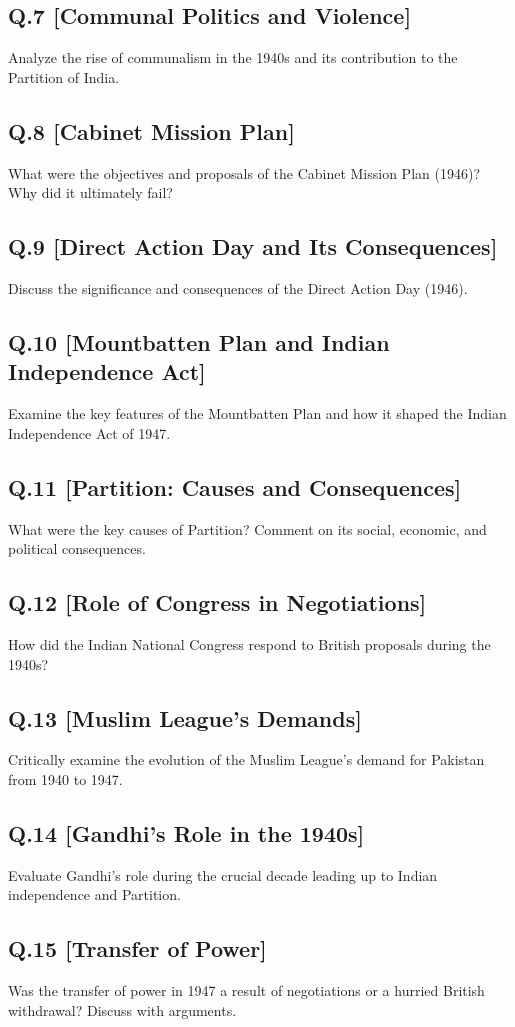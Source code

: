 \subsection*{Q.7 [Communal Politics and Violence]}
Analyze the rise of communalism in the 1940s and its contribution to the Partition of India.

\subsection*{Q.8 [Cabinet Mission Plan]}
What were the objectives and proposals of the Cabinet Mission Plan (1946)? Why did it ultimately fail?

\subsection*{Q.9 [Direct Action Day and Its Consequences]}
Discuss the significance and consequences of the Direct Action Day (1946).

\subsection*{Q.10 [Mountbatten Plan and Indian Independence Act]}
Examine the key features of the Mountbatten Plan and how it shaped the Indian Independence Act of 1947.

\subsection*{Q.11 [Partition: Causes and Consequences]}
What were the key causes of Partition? Comment on its social, economic, and political consequences.

\subsection*{Q.12 [Role of Congress in Negotiations]}
How did the Indian National Congress respond to British proposals during the 1940s?

\subsection*{Q.13 [Muslim League’s Demands]}
Critically examine the evolution of the Muslim League’s demand for Pakistan from 1940 to 1947.

\subsection*{Q.14 [Gandhi’s Role in the 1940s]}
Evaluate Gandhi’s role during the crucial decade leading up to Indian independence and Partition.

\subsection*{Q.15 [Transfer of Power]}
Was the transfer of power in 1947 a result of negotiations or a hurried British withdrawal? Discuss with arguments.
